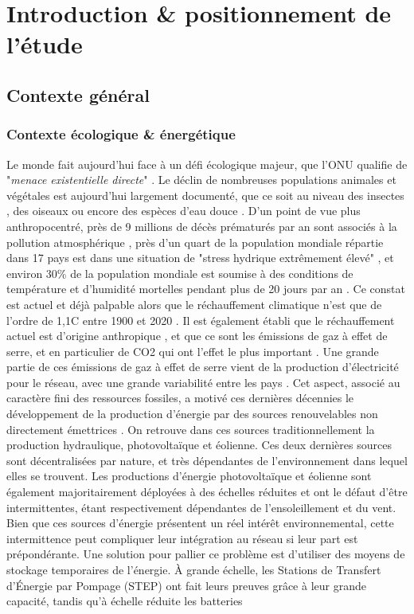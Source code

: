 \chapter{Introduction \& positionnement de l'étude}

\section{Contexte général}
\subsection{Contexte écologique \& énergétique}
Le monde fait aujourd'hui face à un défi écologique majeur, que l'ONU qualifie de "\textit{menace existentielle directe}" \cite{noauthor_direct_2018}. Le déclin de nombreuses populations animales et végétales est aujourd'hui largement documenté, que ce soit au niveau des insectes \cite{hallmann_more_2017}, des oiseaux \cite{inger_common_2015} \cite{rosenberg_decline_2019} ou encore des espèces d'eau douce \cite{he_global_2019}. D'un point de vue plus anthropocentré, près de 9 millions de décès prématurés par an sont associés à la pollution atmosphérique \cite{burnett_global_2018}, près d'un quart de la population mondiale répartie dans 17 pays est dans une situation de "stress hydrique extrêmement élevé" \cite{kuzma_25_2023}, et environ 30\% de la population mondiale est soumise à des conditions de température et d'humidité mortelles pendant plus de 20 jours par an \cite{mora_global_2017}. Ce constat est actuel et déjà palpable alors que le réchauffement climatique n'est que de l'ordre de 1,1\textdegree C entre 1900 et 2020 \cite{noauthor_ar6_nodate}. Il est également établi que le réchauffement actuel est d'origine anthropique \cite{noauthor_ar5_nodate}, et que ce sont les émissions de gaz à effet de serre, et en particulier de CO2 qui ont l'effet le plus important \cite{noauthor_ar6_nodate}. Une grande partie de ces émissions de gaz à effet de serre vient de la production d'électricité pour le réseau, avec une grande variabilité entre les pays \cite{noauthor_resume_nodate}. Cet aspect, associé au caractère fini des ressources fossiles, a motivé ces dernières décennies le développement de la production d'énergie par des sources renouvelables non directement émettrices \cite{noauthor_shift_nodate}. On retrouve dans ces sources traditionnellement la production hydraulique, photovoltaïque et éolienne. Ces deux dernières sources sont décentralisées par nature, et très dépendantes de l'environnement dans lequel elles se trouvent. Les productions d'énergie photovoltaïque et éolienne sont également majoritairement déployées à des échelles réduites et ont le défaut d'être intermittentes, étant respectivement dépendantes de l'ensoleillement et du vent. Bien que ces sources d'énergie présentent un réel intérêt environnemental, cette intermittence peut compliquer leur intégration au réseau si leur part est prépondérante. Une solution pour pallier ce problème est d'utiliser des moyens de stockage temporaires de l'énergie. À grande échelle, les Stations de Transfert d'Énergie par Pompage (STEP) ont fait leurs preuves \cite{zhao_review_2022}\cite{wang_coordinated_2023} grâce à leur grande capacité, tandis qu'à échelle réduite les batteries 